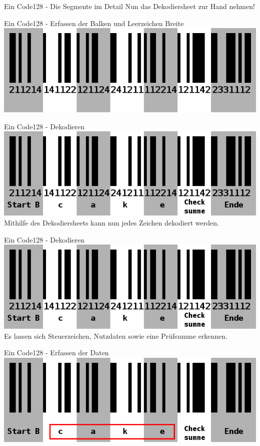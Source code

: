 \begin{frame}{Ein Code128 - Die Segmente im Detail}
	\hfill Nun das Dekodiersheet zur Hand nehmen! \hfill\hbox{}
\end{frame}

\begin{frame}{Ein Code128 - Erfassen der Balken und Leerzeichen Breite}
	\hfill\includegraphics[width=.95\textwidth]{muzy/cake_7.png}\hfill\hbox{}
\end{frame}

\begin{frame}{Ein Code128 - Dekodieren}
	\hfill\includegraphics[width=.95\textwidth]{muzy/cake_8.png}\hfill\hbox{}
	\hfill Mithilfe des Dekodiersheets kann nun jedes Zeichen dekodiert werden. \hfill\hbox{}
\end{frame}
\begin{frame}{Ein Code128 - Dekodieren}
	\hfill\includegraphics[width=.95\textwidth]{muzy/cake_8.png}\hfill\hbox{}
	\hfill Es lassen sich Steuerzeichen, Nutzdaten sowie eine Prüfsumme erkennen. \hfill\hbox{}
\end{frame}

\begin{frame}{Ein Code128 - Erfassen der Daten}
	\hfill\includegraphics[width=.95\textwidth]{muzy/cake_9.png}\hfill\hbox{}
\end{frame}


